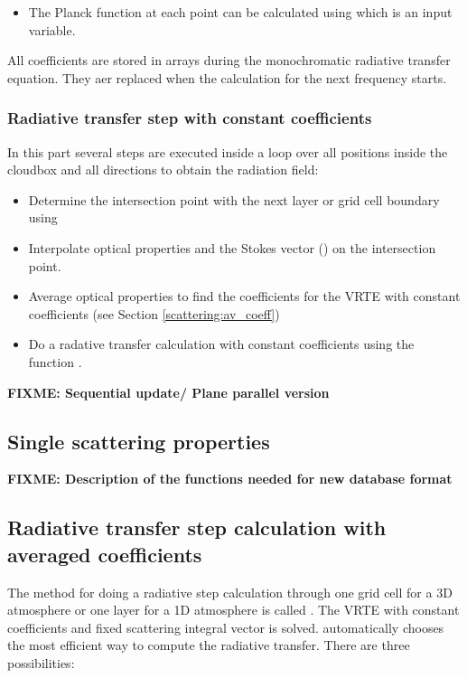 \begin{itemize}
\item The Planck function at each point can be calculated using
   which is an input variable.

\end{itemize}

All coefficients are stored in arrays during the monochromatic
radiative transfer equation. They aer replaced when the calculation
for the next frequency starts.

\subsubsection{Radiative transfer step with constant coefficients}

In this part several steps are executed inside a loop over all
positions inside the cloudbox and all directions to obtain the
radiation field:
\begin{itemize}
\item Determine the intersection point with the next layer or grid
  cell boundary using 
\item Interpolate optical properties and the Stokes vector
  () on the intersection point.
\item Average optical properties to find the coefficients for the VRTE
  with constant coefficients (see Section \ref{scattering:av_coeff})
\item Do a radative transfer calculation with constant coefficients
  using the function .
\end{itemize}

{\bf FIXME: Sequential update/ Plane parallel version}




\subsection{Single scattering properties}
\label{sec:scattering:single_scat_prop}

{\bf FIXME: Description of the functions needed for new database format}


\subsection{Radiative transfer step calculation with averaged
  coefficients}
\label{sec:scattering:rte_step}
The method for doing a radiative step calculation through one grid
cell for a 3D atmosphere or one layer for a 1D atmosphere is called
. The VRTE with constant coefficients and fixed
scattering integral vector is solved.  
automatically chooses the most efficient way to compute the radiative
transfer. There are three possibilities:

